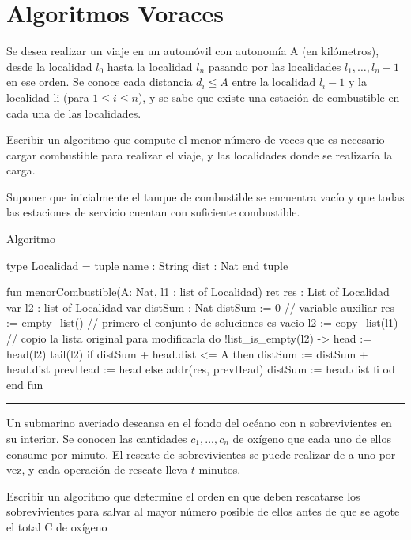 \section{Algoritmos Voraces}
Se desea realizar un viaje en un automóvil con autonomía A (en kilómetros), desde la localidad $l_0$ hasta la localidad $l_n$ pasando por las localidades $l_1, \dots , l_n-1$ en ese orden. Se conoce cada distancia $d_i \leq A$ entre la localidad $l_i-1$ y la localidad li (para $1 \leq i \leq n$), y se sabe que existe una estación de combustible en cada una de las localidades.

Escribir un algoritmo que compute el menor número de veces que es necesario cargar combustible para realizar el viaje, y las localidades donde se realizaría la carga.

Suponer que inicialmente el tanque de combustible se encuentra vacío y que todas las estaciones de servicio cuentan con suficiente combustible.

\begin{codebox}{Algoritmo}
\begin{pascallike}
type Localidad = tuple
                    name : String
                    dist : Nat
                end tuple

fun menorCombustible(A: Nat, l1 : list of Localidad) ret res : List of Localidad
    var l2 : list of Localidad
    var distSum : Nat 
    distSum := 0 // variable auxiliar
    res := empty_list() // primero el conjunto de soluciones es vacio
    l2 := copy_list(l1) // copio la lista original para modificarla
    do !list_is_empty(l2) ->
        head := head(l2)
        tail(l2)
        if distSum + head.dist <= A then
        distSum := distSum + head.dist
        prevHead := head
        else 
        addr(res, prevHead)
        distSum := head.dist
        fi
    od
end fun
\end{pascallike}
\end{codebox}

\begin{center}
    \rule{\textwidth}{0.4pt}
\end{center}

Un submarino averiado descansa en el fondo del océano con n sobrevivientes en su interior. Se conocen las cantidades $c_1, . . . , c_n$ de oxígeno que cada uno de ellos consume por minuto. El rescate de sobrevivientes se puede realizar de a uno por vez, y cada operación de rescate lleva $t$ minutos.

Escribir un algoritmo que determine el orden en que deben rescatarse los sobrevivientes para salvar al mayor número posible de ellos antes de que se agote el total C de oxígeno

